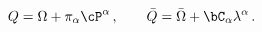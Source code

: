 \begin{equation}
Q=\Omega+\pi_\alpha \cP^\alpha\,, \qquad \bar Q = \bar{\Omega}
+\bC_\alpha \lambda^\alpha\,.
\end{equation}

